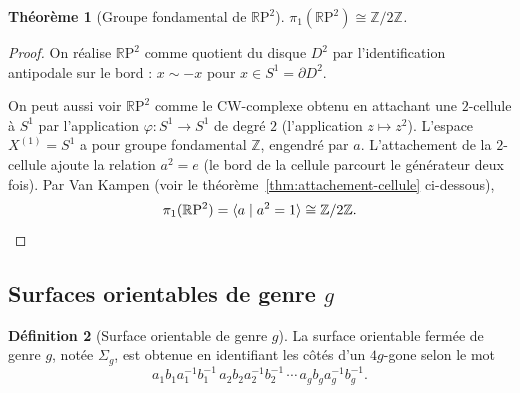 \documentclass[12pt,a4paper,openany]{book}
\theoremstyle{definition}
\newtheorem{definition}{Définition}[chapter]
\theoremstyle{plain}
\newtheorem{theoreme}[definition]{Théorème}
\theoremstyle{remark}
\newcommand{\Z}{\mathbb{Z}}
\newcommand{\RP}{\mathbb{R}\mathrm{P}}
\begin{document}
\begin{theoreme}[{Groupe fondamental de $\RP^2$}]\label{thm:pi1-rp2}
$\pi_1(\RP^2) \cong \Z/2\Z$.
\end{theoreme}

\begin{proof}
On réalise $\RP^2$ comme quotient du disque $D^2$ par l'identification antipodale sur le bord :
$x \sim -x$ pour $x \in S^1 = \partial D^2$.

\begin{center}
\end{center}

On peut aussi voir $\RP^2$ comme le CW-complexe obtenu en attachant une $2$-cellule à $S^1$
par l'application $\varphi \colon S^1 \to S^1$ de degré $2$ (l'application $z \mapsto z^2$).
L'espace $X^{(1)} = S^1$ a pour groupe fondamental $\Z$, engendré par $a$.
L'attachement de la $2$-cellule ajoute la relation $a^2 = e$ (le bord de la cellule parcourt
le générateur deux fois). Par Van Kampen (voir le théorème~\ref{thm:attachement-cellule} ci-dessous),
\[
\pi_1(\RP^2) = \langle a \mid a^2 = 1 \rangle \cong \Z/2\Z. \qedhere
\]
\end{proof}

\subsection{Surfaces orientables de genre \texorpdfstring{$g$}{g}}\label{subsec:surfaces-genre}

\begin{definition}[Surface orientable de genre $g$]\label{def:surface-genre}
La surface orientable fermée de genre $g$, notée $\Sigma_g$, est obtenue en identifiant les
côtés d'un $4g$-gone selon le mot
\[
a_1 b_1 a_1^{-1} b_1^{-1}\, a_2 b_2 a_2^{-1} b_2^{-1} \,\cdots\, a_g b_g a_g^{-1} b_g^{-1}.
\]
\end{definition}
\end{document}
